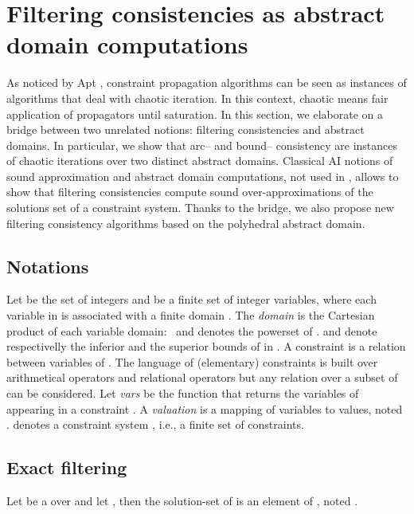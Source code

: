 \documentclass[submission,copyright,creativecommons]{eptcs}
\begin{document}
\section{Filtering consistencies as abstract domain computations}
\label{sec:absdom-cons}
As noticed by Apt \cite{Apt99a}, constraint propagation algorithms can be seen as
instances of algorithms that deal with chaotic iteration. In this context, chaotic means fair application of
propagators until saturation. In this section, we elaborate on a bridge between two
unrelated notions: filtering consistencies and abstract domains. In particular, we show that arc-- and 
bound-- consistency are instances of chaotic iterations over two distinct 
abstract domains. Classical AI notions of sound approximation and abstract domain
computations, not used in \cite{Apt99a}, allows to show that filtering consistencies compute sound 
over-approximations of the solutions set of a constraint system. Thanks to the bridge, we also propose new filtering
consistency algorithms based on the polyhedral abstract domain. 

\subsection{Notations}
Let  be the set of integers and  be a finite set of integer variables, where each variable  in  is
associated with a finite domain . The {\it domain} 
 is the Cartesian product of each variable domain:~ and
 denotes the powerset of .  and  denote
respectivelly the inferior and the superior bounds of  in .
A constraint  is
a relation between variables of . The language of (elementary) constraints is built over arithmetical
operators  and relational operators  but any relation over a subset
of  can be considered. Let {\it vars} be the function that returns the variables of  
appearing in a constraint . A {\it valuation} 
is a mapping of variables to values, noted .  denotes a constraint system , i.e., 
a finite set of constraints.

\subsection{Exact filtering}

Let  be a  over  and let , then
the solution-set of  is an element of , noted .
\end{document}
